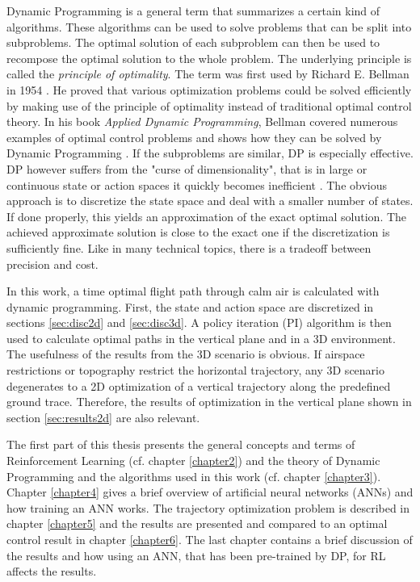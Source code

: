 Dynamic Programming is a general term that summarizes a certain kind of algorithms. These algorithms can be used to solve problems that can be split into subproblems. The optimal solution of each subproblem can then be used to recompose the optimal solution to the whole problem. The underlying principle is called the \textit{principle of optimality}. The term was first used by Richard E. Bellman in 1954 \cite{Bellman1954}. He proved that various optimization problems could be solved efficiently by making use of the principle of optimality instead of traditional optimal control theory. In his book \textit{Applied Dynamic Programming}, Bellman covered numerous examples of optimal control problems and shows how they can be solved by Dynamic Programming \cite{Bellman1962}. 
If the subproblems are similar, DP is especially effective. DP however suffers from the "curse of dimensionality", that is in large or continuous state or action spaces it quickly becomes inefficient \cite{Powell2007ADP}. The obvious approach is to discretize the state space and deal with a smaller number of states. If done properly, this yields an approximation of the exact optimal solution. The achieved approximate solution is close to the exact one if the discretization is sufficiently fine. Like in many technical topics, there is a tradeoff between precision and cost.

In this work, a time optimal flight path through calm air is calculated with dynamic programming. First, the state and action space are discretized in sections \ref{sec:disc2d} and \ref{sec:disc3d}. A policy iteration (PI) algorithm is then used to calculate optimal paths in the vertical plane and in a 3D environment. The usefulness of the results from the 3D scenario is obvious. If airspace restrictions or topography restrict the horizontal trajectory, any 3D scenario degenerates to a 2D optimization of a vertical trajectory along the predefined ground trace. Therefore, the results of optimization in the vertical plane shown in section \ref{sec:results2d} are also relevant.

The first part of this thesis presents the general concepts and terms of Reinforcement Learning (cf. chapter \ref{chapter2}) and the theory of Dynamic Programming and the algorithms used in this work (cf. chapter \ref{chapter3}). Chapter \ref{chapter4} gives a brief overview of artificial neural networks (ANNs) and how training an ANN works. The trajectory optimization problem is described in chapter \ref{chapter5} and the results are presented and compared to an optimal control result in chapter \ref{chapter6}. The last chapter contains a brief discussion of the results and how using an ANN, that has been pre-trained by DP, for RL affects the results.